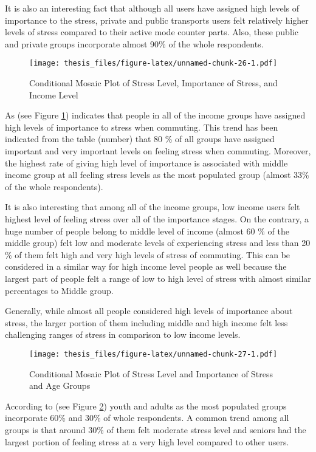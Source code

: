 \documentclass[
11pt, %
oneside, %
english, %
singlespacing, %
]{macthesis} %
\begin{document}
It is also an interesting fact that although all users have assigned high levels of importance to the stress, private and public transports users felt relatively higher levels of stress compared to their active mode counter parts. Also, these public and private groups incorporate almost 90\% of the whole respondents.
\begin{figure}
\centering
\texttt{[image: thesis\_files/figure-latex/unnamed-chunk-26-1.pdf]}
\caption{\label{fig:unnamed-chunk-26}\label{fig:stress importance of stress and income}Conditional Mosaic Plot of Stress Level, Importance of Stress, and Income Level}
\end{figure}
As (see Figure \ref{fig:stress importance of stress and income}) indicates that people in all of the income groups have assigned high levels of importance to stress when commuting. This trend has been indicated from the table (number) that 80 \% of all groups have assigned important and very important levels on feeling stress when commuting. Moreover, the highest rate of giving high level of importance is associated with middle income group at all feeling stress levels as the most populated group (almost 33\% of the whole respondents).

It is also interesting that among all of the income groups, low income users felt highest level of feeling stress over all of the importance stages. On the contrary, a huge number of people belong to middle level of income (almost 60 \% of the middle group) felt low and moderate levels of experiencing stress and less than 20 \% of them felt high and very high levels of stress of commuting. This can be considered in a similar way for high income level people as well because the largest part of people felt a range of low to high level of stress with almost similar percentages to Middle group.

Generally, while almost all people considered high levels of importance about stress, the larger portion of them including middle and high income felt less challenging ranges of stress in comparison to low income levels.
\begin{figure}
\centering
\texttt{[image: thesis\_files/figure-latex/unnamed-chunk-27-1.pdf]}
\caption{\label{fig:unnamed-chunk-27}\label{fig:stress importance of stress and age}Conditional Mosaic Plot of Stress Level and Importance of Stress and Age Groups}
\end{figure}
According to (see Figure \ref{fig:stress importance of stress and age}) youth and adults as the most populated groups incorporate 60\% and 30\% of whole respondents. A common trend among all groups is that around 30\% of them felt moderate stress level and seniors had the largest portion of feeling stress at a very high level compared to other users.
\end{document}
